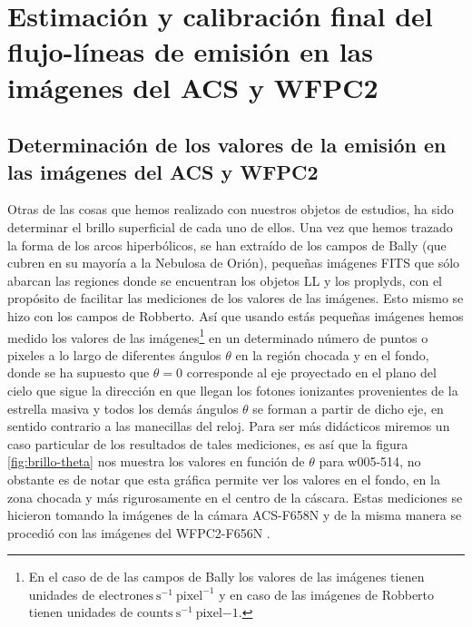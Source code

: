 \section{Estimación y calibración final del flujo-líneas de emisión en las imágenes del ACS y WFPC2}
\label{sec:clibration-final}

\subsection{Determinación de los valores  de la emisión en las imágenes del ACS y WFPC2 }
\label{sec:brillo-superficial}
Otras de las cosas que hemos realizado con nuestros objetos de estudios, ha  sido determinar el brillo superficial de cada uno de ellos. Una vez que hemos trazado la forma de los arcos hiperbólicos, se han extraído de los campos de Bally (que cubren en su mayoría a la Nebulosa de Orión), pequeñas imágenes FITS que sólo abarcan las regiones donde se encuentran los objetos LL y los proplyds, con el propósito de facilitar las mediciones de los valores de las imágenes. Esto mismo se hizo con los campos de Robberto. Así que usando estás pequeñas imágenes hemos medido los valores de las imágenes\footnote{En el caso de de las campos de Bally los valores de las imágenes tienen unidades de \(\mathrm{electrones~s^{-1}~pixel^{-1}}\) y en caso de las imágenes de Robberto tienen unidades de \(\text{counts}~\text{s}^{-1}~\text{pixel}{-1}\).} en un determinado número de puntos o pixeles a lo largo de diferentes ángulos \(\theta\) en la región chocada y en el fondo, donde se ha supuesto que \(\theta = 0\) corresponde al eje proyectado en el plano del cielo que sigue la dirección en que llegan los fotones ionizantes provenientes de la estrella masiva y todos los demás ángulos \(\theta\) se forman a partir de dicho eje, en sentido contrario a las manecillas del reloj. Para ser más didácticos miremos un caso particular de los resultados de tales mediciones, es así que la figura \ref{fig:brillo-theta} nos muestra los valores en función de \(\theta\) para w005-514, no obstante es de notar que esta gráfica permite ver los valores en el fondo, en la zona chocada y más rigurosamente en el centro de la cáscara. Estas mediciones se hicieron tomando la imágenes de la cámara ACS-F658N y de la misma manera se procedió con las imágenes del WFPC2-F656N \citep{Robberto:2013a}. \\

